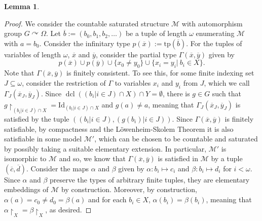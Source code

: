 \documentclass{article}
\newtheorem{lemma}[theorem]{Lemma}
\theoremstyle{remark}
\theoremstyle{definition}
\def\acts{\curvearrowright}
\DeclareMathOperator{\dcl}{dcl}
\newcommand{\M}[0]{\mathcal{M}}
\begin{document}
{{{{{\begin{lemma}
\end{lemma}
\begin{proof} We consider the countable saturated structure $\M$ with automorphism group $G\acts\Omega$. Let $\overline{b}:=(b_0, b_1, b_2, \dots)$ be a tuple of length $\omega$ enumerating $\M$ with $a=b_0$. Consider the infinitary type $p(\overline{x}):=\mathrm{tp}(\overline{b})$. For the tuples of variables of length $\omega$, $\overline{x}$ and $\overline{y}$, consider the partial type $\Gamma(\overline{x}, \overline{y})$ given by
\[p(\overline{x})\cup p(\overline{y}) \cup\{x_0\neq y_0\}\cup\{x_i=y_i\vert\  b_i\in X\}.\]
Note that $\Gamma(\overline{x}, \overline{y})$ is finitely consistent. To see this, for some finite indexing set $J\subseteq\omega$, consider the restriction of $\Gamma$ to variables $x_i$ and $y_i$ from $J$, which we call $\Gamma_J(\overline{x}_J, \overline{y}_J)$. Since $\dcl((b_i\vert i\in J)\cap X)\cap Y=\emptyset$, there is $g\in G$ such that $g\upharpoonright_{(b_i\vert i\in J)\cap X}=\mathrm{Id}_{(b_i\vert i\in J)\cap X}$ and $g(a)\neq a$, meaning that $\Gamma_J(\overline{x}_J, \overline{y}_J)$ is satisfied by the tuple $((b_i\vert i\in J),(g(b_i)\vert i\in J))$. Since $\Gamma(\overline{x}, \overline{y})$ is finitely satisfiable, by compactness and the L\"{o}wenheim-Skolem Theorem it is also satisfiable in some model $\M'$, which can be chosen to be countable and saturated {by possibly taking a suitable elementary extension}. In particular,  $\M'$ is isomorphic to $\M$ and so, we know that $\Gamma(\overline{x}, \overline{y})$ is satisfied in $\M$ by a tuple $(\overline{c}, \overline{d})$. Consider the maps $\alpha$ and $\beta$ given by $\alpha: b_i\mapsto c_i$ and $\beta:b_i\mapsto d_i$ for $i<\omega$. Since $\alpha$ and $\beta$ preserve the types of arbitrary finite tuples, they are elementary embeddings of $\M$ by construction. Moreover, by construction, $\alpha(a)=c_0\neq d_0=\beta(a)$ and for each $b_i\in X$, $\alpha(b_i)=\beta(b_i)$, meaning that $\alpha\upharpoonright_X=\beta\upharpoonright_X$, as desired.
\end{proof}





}}}}}
\end{document}
